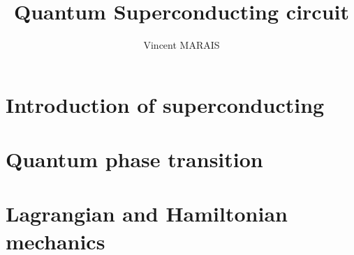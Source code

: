 \documentclass[12pt,a4paper]{article}
\title{Quantum Superconducting circuit}
\author{\textup{Vincent MARAIS}}
\begin{document}
	
	
	\tableofcontents


\newpage
\section{Introduction of superconducting}

\newpage

\section{Quantum phase transition}




\section{Lagrangian and Hamiltonian mechanics}




\end{document}
